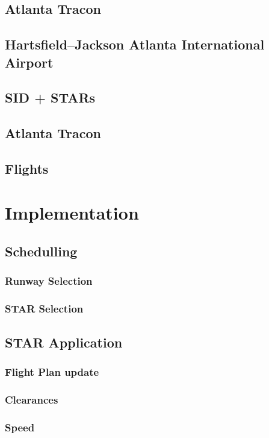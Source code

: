 \section{Atlanta Tracon}
\section{Hartsfield–Jackson Atlanta International Airport}
\section{SID + STARs}
\section{Atlanta Tracon}
\section{Flights}







\chapter{Implementation}

\section{Schedulling}
\subsection{Runway Selection}
\subsection{STAR Selection}

\section{STAR Application}
\subsection{Flight Plan update}
\subsection{Clearances}
\subsection{Speed}

